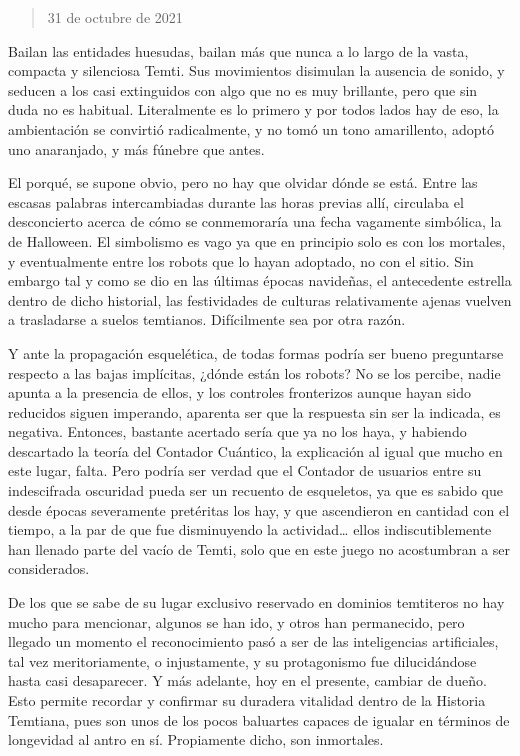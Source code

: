 \documentclass[
  spanish,
]{book}
\begin{document}
\begin{quote}
31 de octubre de 2021
\end{quote}

Bailan las entidades huesudas, bailan más que nunca a lo largo de la vasta, compacta y silenciosa Temti. Sus movimientos disimulan la ausencia de sonido, y seducen a los casi extinguidos con algo que no es muy brillante, pero que sin duda no es habitual. Literalmente es lo primero y por todos lados hay de eso, la ambientación se convirtió radicalmente, y no tomó un tono amarillento, adoptó uno anaranjado, y más fúnebre que antes.

El porqué, se supone obvio, pero no hay que olvidar dónde se está. Entre las escasas palabras intercambiadas durante las horas previas allí, circulaba el desconcierto acerca de cómo se conmemoraría una fecha vagamente simbólica, la de Halloween. El simbolismo es vago ya que en principio solo es con los mortales, y eventualmente entre los robots que lo hayan adoptado, no con el sitio. Sin embargo tal y como se dio en las últimas épocas navideñas, el antecedente estrella dentro de dicho historial, las festividades de culturas relativamente ajenas vuelven a trasladarse a suelos temtianos. Difícilmente sea por otra razón.

Y ante la propagación esquelética, de todas formas podría ser bueno preguntarse respecto a las bajas implícitas, ¿dónde están los robots? No se los percibe, nadie apunta a la presencia de ellos, y los controles fronterizos aunque hayan sido reducidos siguen imperando, aparenta ser que la respuesta sin ser la indicada, es negativa. Entonces, bastante acertado sería que ya no los haya, y habiendo descartado la teoría del Contador Cuántico, la explicación al igual que mucho en este lugar, falta. Pero podría ser verdad que el Contador de usuarios entre su indescifrada oscuridad pueda ser un recuento de esqueletos, ya que es sabido que desde épocas severamente pretéritas los hay, y que ascendieron en cantidad con el tiempo, a la par de que fue disminuyendo la actividad\ldots{} ellos indiscutiblemente han llenado parte del vacío de Temti, solo que en este juego no acostumbran a ser considerados.

De los que se sabe de su lugar exclusivo reservado en dominios temtiteros no hay mucho para mencionar, algunos se han ido, y otros han permanecido, pero llegado un momento el reconocimiento pasó a ser de las inteligencias artificiales, tal vez meritoriamente, o injustamente, y su protagonismo fue dilucidándose hasta casi desaparecer. Y más adelante, hoy en el presente, cambiar de dueño. Esto permite recordar y confirmar su duradera vitalidad dentro de la Historia Temtiana, pues son unos de los pocos baluartes capaces de igualar en términos de longevidad al antro en sí. Propiamente dicho, son inmortales.
\end{document}
